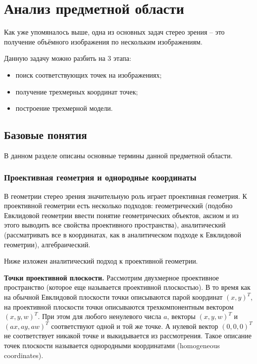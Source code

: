 \chapter{Анализ предметной области}
Как уже упомяналось выше, одна из основных задач стерео зрения -- это получение объёмного изображения по нескольким изображениям.

Данную задачу можно разбить на 3 этапа:

\begin{itemize}
	\item поиск соответствующих	точек на изображениях;
	\item получение трехмерных координат точек;
	\item построение трехмерной модели.
\end{itemize}

\section{Базовые понятия}
В данном разделе описаны основные термины данной предметной области.



\subsection{Проективная геометрия и однородные координаты}
В геометрии стерео зрения значительную роль играет проективная геометрия. К проективной геометрии есть несколько подходов: геометрический (подобно Евклидовой геометрии ввести понятие геометрических объектов, аксиом и из этого выводить все свойства проективного пространства), аналитический (рассматривать все в координатах, как в аналитическом подходе к Евклидовой геометрии), алгебраический.

Ниже изложен аналитический подход к проективной геометрии.

\textbf{Точки проективной плоскости.} Рассмотрим двухмерное проективное пространство (которое еще называется проективной плоскостью). В то время как на обычной Евклидовой плоскости точки описываются парой координат $(x,y)^T$, на проективной плоскости точки описываются трехкомпонентным вектором $(x,y,w)^T$. При этом для любого ненулевого числа $a$, векторы $(x,y,w)^T$ и $(ax, ay, aw)^T$ соответствуют одной и той же точке. А нулевой вектор $(0,0,0)^T$ не соответствует никакой точке и выкидывается из рассмотрения. Такое описание точек плоскости называется однородными координатами (homogeneous coordinates).

